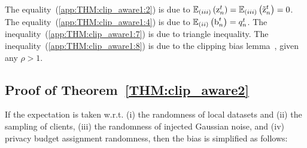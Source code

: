 The equality~(\ref{app:THM:clip_aware1:2}) is due to $\mathbb{E}_{(iii)}\left({{\textnormal{z}}_n^t}\right)=\mathbb{E}_{(iii)}\left({\tilde{{\textnormal{z}}}_n^t}\right)=0$. The equality~(\ref{app:THM:clip_aware1:4}) is due to $\mathbb{E}_{(ii)}\left({{\textnormal{b}}_n^t}\right)=q_n^t$. The inequality~(\ref{app:THM:clip_aware1:7}) is due to triangle inequality. The inequality~(\ref{app:THM:clip_aware1:8}) is due to the clipping bias lemma~\citep{das2023beyond}, given any $\rho>1$.   


\subsection{Proof of Theorem~\ref{THM:clip_aware2}}\label{app:THM:clip_aware2}

If the expectation is taken w.r.t. (i) the randomness of local datasets and (ii) the sampling of clients, (iii) the randomness of injected Gaussian noise, and (iv) privacy budget assignment randomness, then the bias is simplified as follows:

